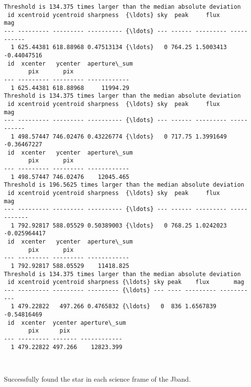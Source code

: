\documentclass[11pt]{article}
\begin{document}
    \begin{Verbatim}[commandchars=\\\{\}]
Threshold is 134.375 times larger than the median absolute deviation
 id xcentroid ycentroid sharpness  {\ldots} sky  peak     flux       mag
--- --------- --------- ---------- {\ldots} --- ------ --------- -----------
  1 625.44381 618.88968 0.47513134 {\ldots}   0 764.25 1.5003413 -0.44047516
 id  xcenter   ycenter  aperture\_sum
       pix       pix
--- --------- --------- ------------
  1 625.44381 618.88968     11994.29
Threshold is 134.375 times larger than the median absolute deviation
 id xcentroid ycentroid sharpness  {\ldots} sky  peak     flux       mag
--- --------- --------- ---------- {\ldots} --- ------ --------- -----------
  1 498.57447 746.02476 0.43226774 {\ldots}   0 717.75 1.3991649 -0.36467227
 id  xcenter   ycenter  aperture\_sum
       pix       pix
--- --------- --------- ------------
  1 498.57447 746.02476    12045.465
Threshold is 196.5625 times larger than the median absolute deviation
 id xcentroid ycentroid sharpness  {\ldots} sky  peak     flux       mag
--- --------- --------- ---------- {\ldots} --- ------ --------- ------------
  1 792.92817 588.05529 0.50389003 {\ldots}   0 768.25 1.0242023 -0.025964417
 id  xcenter   ycenter  aperture\_sum
       pix       pix
--- --------- --------- ------------
  1 792.92817 588.05529    11418.825
Threshold is 134.375 times larger than the median absolute deviation
 id xcentroid ycentroid sharpness {\ldots} sky peak    flux       mag
--- --------- --------- --------- {\ldots} --- ---- --------- -----------
  1 479.22822   497.266 0.4765832 {\ldots}   0  836 1.6567839 -0.54816469
 id  xcenter  ycenter aperture\_sum
       pix      pix
--- --------- ------- ------------
  1 479.22822 497.266    12823.399
    \end{Verbatim}

    \begin{center}
    \end{center}
    { \hspace*{\fill} \\}
    
    Successfully found the star in each science frame of the Jband.
\end{document}
